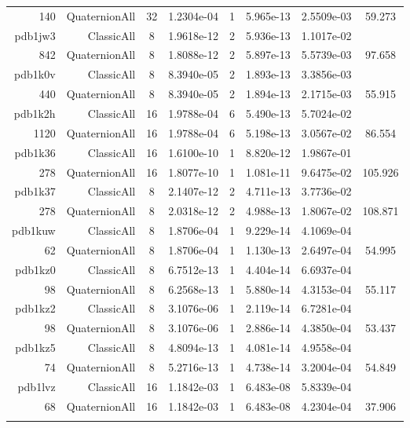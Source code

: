 \begin{xltabular}{\textwidth}{r|rcS[table-format=1.4e+2]cS[table-format=1.3e+2]S[table-format=1.4e+2]S[table-format=-1.3]}
140 & QuaternionAll & 32 & 1.2304e-04 & 1 & 5.965e-13 & 2.5509e-03 & 59.273\\  \addlinespace
pdb1jw3 & ClassicAll & 8 & 1.9618e-12 & 2 & 5.936e-13 & 1.1017e-02 & \\
842 & QuaternionAll & 8 & 1.8088e-12 & 2 & 5.897e-13 & 5.5739e-03 & 97.658\\  \addlinespace
pdb1k0v & ClassicAll & 8 & 8.3940e-05 & 2 & 1.893e-13 & 3.3856e-03 & \\
440 & QuaternionAll & 8 & 8.3940e-05 & 2 & 1.894e-13 & 2.1715e-03 & 55.915\\  \addlinespace
pdb1k2h & ClassicAll & 16 & 1.9788e-04 & 6 & 5.490e-13 & 5.7024e-02 & \\
1120 & QuaternionAll & 16 & 1.9788e-04 & 6 & 5.198e-13 & 3.0567e-02 & 86.554\\  \addlinespace
pdb1k36 & ClassicAll & 16 & 1.6100e-10 & 1 & 8.820e-12 & 1.9867e-01 & \\
278 & QuaternionAll & 16 & 1.8077e-10 & 1 & 1.081e-11 & 9.6475e-02 & 105.926\\  \addlinespace
pdb1k37 & ClassicAll & 8 & 2.1407e-12 & 2 & 4.711e-13 & 3.7736e-02 & \\
278 & QuaternionAll & 8 & 2.0318e-12 & 2 & 4.988e-13 & 1.8067e-02 & 108.871\\  \addlinespace
pdb1kuw & ClassicAll & 8 & 1.8706e-04 & 1 & 9.229e-14 & 4.1069e-04 & \\
62 & QuaternionAll & 8 & 1.8706e-04 & 1 & 1.130e-13 & 2.6497e-04 & 54.995\\  \addlinespace
pdb1kz0 & ClassicAll & 8 & 6.7512e-13 & 1 & 4.404e-14 & 6.6937e-04 & \\
98 & QuaternionAll & 8 & 6.2568e-13 & 1 & 5.880e-14 & 4.3153e-04 & 55.117\\  \addlinespace
pdb1kz2 & ClassicAll & 8 & 3.1076e-06 & 1 & 2.119e-14 & 6.7281e-04 & \\
98 & QuaternionAll & 8 & 3.1076e-06 & 1 & 2.886e-14 & 4.3850e-04 & 53.437\\  \addlinespace
pdb1kz5 & ClassicAll & 8 & 4.8094e-13 & 1 & 4.081e-14 & 4.9558e-04 & \\
74 & QuaternionAll & 8 & 5.2716e-13 & 1 & 4.738e-14 & 3.2004e-04 & 54.849\\  \addlinespace
pdb1lvz & ClassicAll & 16 & 1.1842e-03 & 1 & 6.483e-08 & 5.8339e-04 & \\
68 & QuaternionAll & 16 & 1.1842e-03 & 1 & 6.483e-08 & 4.2304e-04 & 37.906\\  \addlinespace

\end{xltabular}
